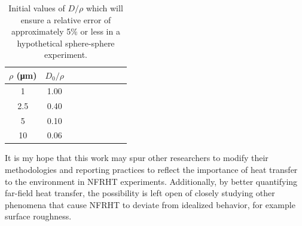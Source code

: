\begin{table}
	\caption{\label{tab:ErrorInSphereSphere}Initial values of $D/\rho$ which will ensure a relative error of approximately 5\% or less in a hypothetical sphere-sphere experiment.}
	\begin{center}
		\renewcommand{\arraystretch}{1.15}
		\setlength{\tabcolsep}{0.10cm}
		\begin{tabular}{ccccccccc}
			\hline 
			\multicolumn{1}{c}{$\rho$ (\si{\micro\meter})} &
			\multicolumn{1}{c}{$D_{0}/\rho$} \\
			\hline
			1 & 1.00 \\ 
			2.5 & 0.40 \\
			5 & 0.10 \\
			10 & 0.06 \\
			\hline
		\end{tabular} 
	\end{center}
\end{table}

It is my hope that this work may spur other researchers to modify their methodologies and reporting practices to reflect the importance of heat transfer to the environment in NFRHT experiments. Additionally, by better quantifying far-field heat transfer, the possibility is left open of closely studying other phenomena that cause NFRHT to deviate from idealized behavior, for example surface roughness.\cite{Kruger2013, Chen2015}